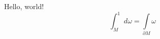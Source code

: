 \documentclass[a4paper, 12pt]{article}
\begin{document}
    Hello, world!
    \[
        \int_{M}^1 d\omega = \int\limits_{\partial M} \omega
    \]
\end{document}
